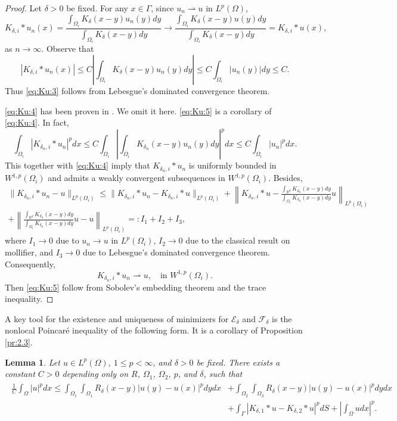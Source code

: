 \documentclass{article}
\newcommand{\R}{\mathbb{R}}
\newtheorem{lemma}[theorem]{Lemma}
\theoremstyle{definition}
\begin{document}
\begin{proof}
Let $\delta>0$ be fixed.
For any $x\in\Gamma$,
since $u_n\rightharpoonup u$ in $L^p(\Omega)$,
\[
K_{\delta,i}\ast u_n(x)
=\frac{\int_{\Omega_i}K_\delta(x-y)u_n(y)dy}{\int_{\Omega_i}K_\delta(x-y)dy}
\rightarrow \frac{\int_{\Omega_i}K_\delta(x-y)u(y)dy}{\int_{\Omega_i}K_\delta(x-y)dy}
=K_{\delta,i}\ast u(x),
\]
as $n\rightarrow\infty$.
Observe that
\[
|K_{\delta,i}\ast u_n(x)|
\leq C\left|\int_{\Omega_i}K_\delta(x-y)u_n(y)dy\right|
\leq C\int_{\Omega_i}\left|u_n(y)\right|dy
\leq C.
\]
Thus \eqref{eq:Ku:3} follows from Lebesgue's dominated convergence theorem.

\eqref{eq:Ku:4} has been proven in \cite[Lemma 5.4]{gan2024convergence}. We omit it here.
\eqref{eq:Ku:5} is a corollary of \eqref{eq:Ku:4}.
In fact,
\[
\int_{\Omega_i}|K_{\delta_n,i}\ast u_n|^pdx
\leq C\int_{\Omega_i}\left|\int_{\Omega_i}K_{\delta_n}(x-y)u_n(y)dy\right|^pdx
\leq C\int_{\Omega_i}|u_n|^pdx.
\]
This together with \eqref{eq:Ku:4} imply that
$K_{\delta_n,i}\ast u_n$ is uniformly bounded in $W^{1,p}(\Omega_i)$ and admits a weakly convergent subsequences in $W^{1,p}(\Omega_i)$.
Besides,
\begin{align*}
  \|K_{\delta_n,i}\ast u_n-u\|_{L^p(\Omega_i)}
  \leq \|K_{\delta_n,i}\ast u_n-K_{\delta_n,i}\ast u\|_{L^p(\Omega_i)}
  +\left\|K_{\delta_n,i}\ast u-\frac{\int_{\R^d}K_{\delta_n}(x-y)dy}{\int_{\Omega_i}K_{\delta_n}(x-y)dy}u\right\|_{L^p(\Omega_i)}\\
  +\left\|\frac{\int_{\R^d}K_{\delta_n}(x-y)dy}{\int_{\Omega_i}K_{\delta_n}(x-y)dy}u-u\right\|_{L^p(\Omega_i)}
  =:I_1+I_2+I_3,
\end{align*}
where $I_1\rightarrow 0$ due to $u_n\rightarrow u$ in $L^p(\Omega_i)$,
$I_2\rightarrow 0$ due to the classical result on mollifier,
and $I_3\rightarrow 0$ due to Lebesgue’s dominated convergence theorem.
Consequently,
\[
K_{\delta_n,i}\ast u_n\rightharpoonup u,\quad \mbox{in } W^{1,p}(\Omega_i).
\]
Then \eqref{eq:Ku:5} follow from Sobolev's embedding theorem and the trace inequality.
\end{proof}



A key tool for the existence and uniqueness of minimizers for $\mathcal{E}_\delta$ and $\mathcal{F}_\delta$ is the nonlocal Poincar\'{e} inequality of the following form.
It is a corollary of Proposition \ref{pr:2.3}.
\begin{lemma}\label{le:poincare}
  Let $u\in L^p(\Omega)$, $1\leq p<\infty$, and $\delta>0$ be fixed. There exists a constant $C>0$ depending only on $R$, $\Omega_1$, $\Omega_2$, $p$, and $\delta$, such that
  \begin{align}\label{eq:poincare}
  \begin{split}
    \frac{1}{C}\int_{\Omega} |u|^pdx
    \leq \int_{\Omega_1}\int_{\Omega_1}R_\delta(x-y)|u(y)-u(x)|^pdydx
    &+\int_{\Omega_2}\int_{\Omega_2}R_\delta(x-y)|u(y)-u(x)|^pdydx\\
    &+\int_\Gamma\left|K_{\delta,1}\ast u-K_{\delta,2}\ast u\right|^pdS
    +\left|\int_{\Omega} udx\right|^p.
    \end{split}
  \end{align}
\end{lemma}
\end{document}
